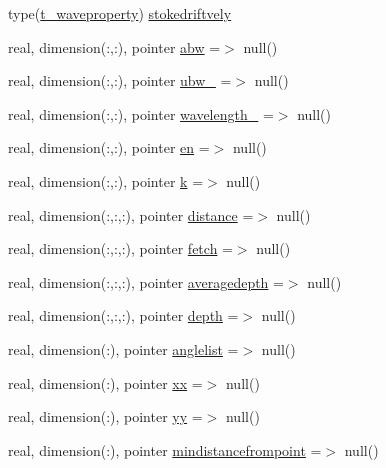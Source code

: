 \begin{DoxyCompactItemize}
\item 
type(\mbox{\hyperlink{structmodulewaves_1_1t__waveproperty}{t\+\_\+waveproperty}}) \mbox{\hyperlink{structmodulewaves_1_1t__waves_a3e326322ddc22132523bd443ae805d2c}{stokedriftvely}}
\item 
real, dimension(\+:,\+:), pointer \mbox{\hyperlink{structmodulewaves_1_1t__waves_a22ef70487683258f826e3cf80b87d978}{abw}} =$>$ null()
\item 
real, dimension(\+:,\+:), pointer \mbox{\hyperlink{structmodulewaves_1_1t__waves_a0fd35689d5ebfaec0068b2e98d1e3333}{ubw\+\_\+}} =$>$ null()
\item 
real, dimension(\+:,\+:), pointer \mbox{\hyperlink{structmodulewaves_1_1t__waves_ab0957a4d95caddc2c24364edc1d2fc9f}{wavelength\+\_\+}} =$>$ null()
\item 
real, dimension(\+:,\+:), pointer \mbox{\hyperlink{structmodulewaves_1_1t__waves_ac660a5aca77c58de4a81a7b4414ae0ac}{en}} =$>$ null()
\item 
real, dimension(\+:,\+:), pointer \mbox{\hyperlink{structmodulewaves_1_1t__waves_a8841f8ac7d0129b250410cef3d10d7a7}{k}} =$>$ null()
\item 
real, dimension(\+:,\+:,\+:), pointer \mbox{\hyperlink{structmodulewaves_1_1t__waves_a8664be2c057b5f2bf808a8a19a7b584a}{distance}} =$>$ null()
\item 
real, dimension(\+:,\+:,\+:), pointer \mbox{\hyperlink{structmodulewaves_1_1t__waves_a2f1cb3d397135fd3d6609952fd22c6cc}{fetch}} =$>$ null()
\item 
real, dimension(\+:,\+:,\+:), pointer \mbox{\hyperlink{structmodulewaves_1_1t__waves_aa0704461732d70bd6ceb96ee2b9afd4a}{averagedepth}} =$>$ null()
\item 
real, dimension(\+:,\+:,\+:), pointer \mbox{\hyperlink{structmodulewaves_1_1t__waves_a5eafca6086378b28d8f289f21345192c}{depth}} =$>$ null()
\item 
real, dimension(\+:), pointer \mbox{\hyperlink{structmodulewaves_1_1t__waves_a6b221714f91fe7c61b552b9528fe7cd5}{anglelist}} =$>$ null()
\item 
real, dimension(\+:), pointer \mbox{\hyperlink{structmodulewaves_1_1t__waves_a352b0d937ed63f156fcff6a95292cbee}{xx}} =$>$ null()
\item 
real, dimension(\+:), pointer \mbox{\hyperlink{structmodulewaves_1_1t__waves_a01f6c9042f2bc92d88b0b60b7817bd76}{yy}} =$>$ null()
\item 
real, dimension(\+:), pointer \mbox{\hyperlink{structmodulewaves_1_1t__waves_a5079e7539397115ecf395c9be13569b7}{mindistancefrompoint}} =$>$ null()

\end{DoxyCompactItemize}
